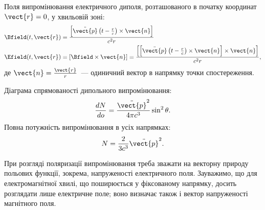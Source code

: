 \begin{Theory}
	Поля випромінювання електричного диполя, розташованого в початку координат $\vect{r} = 0$, у хвильовій зоні:
	\begin{align}\label{eq:dipole_radiation}
		\Bfield(t, \vect{r}) & = \frac{\left[ \ddot{\vect{p}}\left(t - \frac{r}{c}\right)\times \vect{n}\right] }{c^2 r}                                                                       \\
		\Efield(t, \vect{r}) & = \left[ \Bfield \times\vect{n}\right] = \frac{\left[ \left[ \ddot{\vect{p}}\left(t - \frac{r}{c}\right)\times \vect{n}\right]\times \vect{n}\right]  }{c^2 r},
	\end{align}
	де $\vect{n} = \frac{\vect{r}}{r}$~--- одиничний вектор в напрямку точки спостереження.

	Діаграма спрямованості дипольного випромінювання:
	\begin{equation}\label{eq:diagram_direction}
		\frac{dN}{do} = \frac{\ddot{\vect{p}}^2}{4\pi c^3}\sin^2\theta.
	\end{equation}
	Повна потужність випромінювання  в усіх напрямках:
	\begin{equation}\label{eq:power}
		N = \frac{2}{3c^3}\ddot{\vect{p}}^2.
	\end{equation}

%
При розгляді поляризації випромінювання треба зважати на векторну природу польових функції, зокрема, напруженості електричного поля. Зауважимо, що для
електромагнітної хвилі, що поширюється у фіксованому напрямку, досить розглядати лише електричне поле; воно визначає також і вектор напруженості
магнітного поля.


\end{Theory}
